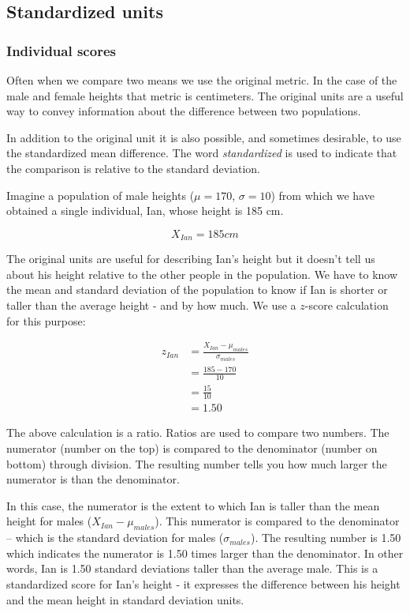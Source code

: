 \documentclass[
]{krantz}
\begin{document}
\hypertarget{standardized-units}{%
\subsection{Standardized units}\label{standardized-units}}

\hypertarget{individual-scores}{%
\subsubsection{Individual scores}\label{individual-scores}}

Often when we compare two means we use the original metric. In the case of the male and female heights that metric is centimeters. The original units are a useful way to convey information about the difference between two populations.

In addition to the original unit it is also possible, and sometimes desirable, to use the standardized mean difference. The word \emph{standardized} is used to indicate that the comparison is relative to the standard deviation.

Imagine a population of male heights (\(\mu = 170\), \(\sigma = 10\)) from which we have obtained a single individual, Ian, whose height is 185 cm.

\[
X_{Ian} = 185cm
\]

The original units are useful for describing Ian's height but it doesn't tell us about his height relative to the other people in the population. We have to know the mean and standard deviation of the population to know if Ian is shorter or taller than the average height - and by how much. We use a \(z\)-score calculation for this purpose:

\[
\begin{aligned} 
z_{Ian} &=  \frac{X_{Ian} - \mu_{males}}{\sigma_{males}}\\ 
&=  \frac{185 - 170}{10}\\
&=  \frac{15}{10}\\
&= 1.50
\end{aligned} 
\]

The above calculation is a ratio. Ratios are used to compare two numbers. The numerator (number on the top) is compared to the denominator (number on bottom) through division. The resulting number tells you how much larger the numerator is than the denominator.

In this case, the numerator is the extent to which Ian is taller than the mean height for males (\(X_{Ian} - \mu_{males}\)). This numerator is compared to the denominator -- which is the standard deviation for males (\(\sigma_{males}\)). The resulting number is 1.50 which indicates the numerator is 1.50 times larger than the denominator. In other words, Ian is 1.50 standard deviations taller than the average male. This is a standardized score for Ian's height - it expresses the difference between his height and the mean height in standard deviation units.
\end{document}
